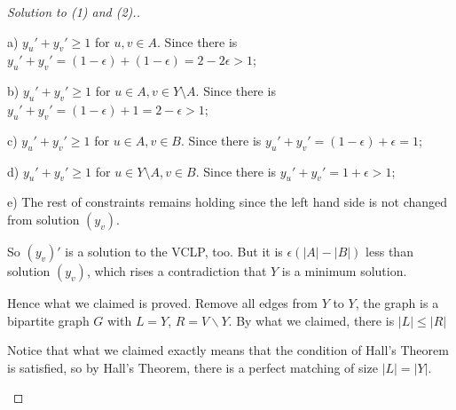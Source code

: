 \begin{proof}[Solution to (1) and (2).]
\begin{enumerate}
            a) $y_u'+y_v'\geq 1$ for $u,v\in A$. Since there is $y_u'+y_v'= (1-\epsilon)+(1-\epsilon)=2-2\epsilon>1$; 
            
            b) $y_u' + y_v' \geq 1$ for $u \in A, v \in Y \setminus A$. Since there is $y_u' + y_v' = (1 - \epsilon) + 1 = 2 - \epsilon > 1$;
    
            c) $y_u'+y_v'\geq 1$ for $u\in A, v\in B$. Since there is $y_u'+y_v' = (1-\epsilon) + \epsilon=1$;
            
            d) $y_u' + y_v' \geq 1$ for $u \in Y \setminus A, v \in B$. Since there is $y_u' + y_v' = 1 + \epsilon > 1$;
    
            e) The rest of constraints remains holding since the left hand side is not changed from solution $(y_v)$. 
    
            So $(y_v)'$ is a solution to the VCLP, too. But it is $\epsilon(|A|-|B|)$ less than solution $(y_v)$, which rises a contradiction that $Y$ is a minimum solution. 
        
            Hence what we claimed is proved. Remove all edges from $Y$ to $Y$, the graph is a bipartite graph $G$ with $L = Y$, $R = V\backslash Y$. By what we claimed, there is $|L|\leq|R|$

            Notice that what we claimed exactly means that the condition of Hall's Theorem is satisfied, so by Hall's Theorem, there is a perfect matching of size $|L|=|Y|$. 
        \end{enumerate}
    \end{proof}


